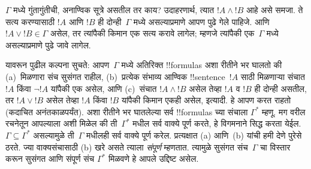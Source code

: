 \documentclass[../../../include/open-logic-section]{subfiles}
\begin{document}
$\Gamma$ मध्ये गुंतागुंतीची, अनाण्विक सूत्रे असतील तर काय? उदाहरणार्थ,
त्यात $!A \land !B$ आहे असे समजा. ते सत्य करण्यासाठी $!A$ आणि $!B$ ही
दोन्ही~$\Gamma$ मध्ये असल्याप्रमाणे आपण पुढे गेले पाहिजे. आणि $!A \lor
!B \in \Gamma$ असेल, तर त्यांपैकी किमान एक सत्य करावे लागेल; म्हणजे
त्यांपैकी एक~$\Gamma$ मध्ये असल्याप्रमाणे पुढे जावे लागेल.

यावरून पुढील कल्पना सुचते: आपण~$\Gamma$ मध्ये अतिरिक्त !!{formula}s
अशा रीतीने भर घालतो की (a)~मिळणारा संच सुसंगत राहील, (b)~प्रत्येक
संभाव्य आण्विक !!{sentence}~$!A$ साठी मिळणाऱ्या संचात $!A$ किंवा
$\lnot !A$ यांपैकी एक असेल, आणि (c)~संचात $!A \land !B$ असेल तेव्हा
$!A$ व $!B$ ही दोन्ही असतील, तर $!A \lor !B$ असेल तेव्हा $!A$ किंवा
$!B$ यांपैकी किमान एकही असेल, इत्यादी. हे आपण करत राहतो (कदाचित
अनंतकाळपर्यंत). अशा रीतीने भर घातलेल्या सर्व !!{formula}s च्या संचाला
$\Gamma^*$ म्हणू. मग वरील रचनेतून आपल्याला अशी
मिळेल की ती~$\Gamma^*$ मधील सर्व वाक्ये पूर्ण करते, हे विगमनाने सिद्ध
करता येईल. $\Gamma \subseteq \Gamma^*$ असल्यामुळे ती~$\Gamma$ मधीलही
सर्व वाक्ये पूर्ण करेल. प्रत्यक्षात (a) आणि~(b) यांची हमी देणे पुरेसे
ठरते. ज्या वाक्यसंचासाठी (b) खरे असते त्याला \emph{संपूर्ण} म्हणतात.
त्यामुळे सुसंगत संच~$\Gamma$ चा विस्तार करून सुसंगत आणि संपूर्ण संच
$\Gamma^*$ मिळवणे हे आपले उद्दिष्ट असेल.
\end{document}
